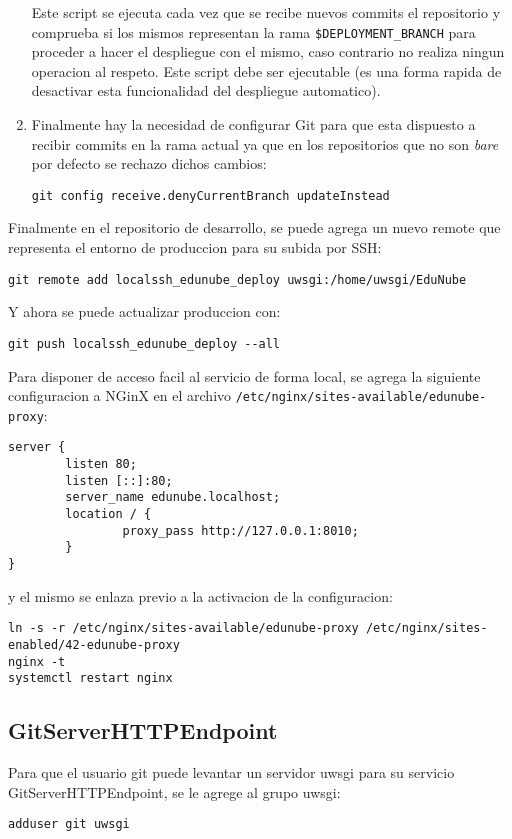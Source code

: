 \begin{enumerate}
\begin{lstlisting}[breaklines=true]
    \end{lstlisting}
    Este script se ejecuta cada vez que se recibe nuevos commits el repositorio y comprueba si los mismos representan la rama \texttt{\$DEPLOYMENT\_BRANCH} para proceder a hacer el despliegue con el mismo, caso contrario no realiza ningun operacion al respeto. Este script debe ser ejecutable (es una forma rapida de desactivar esta funcionalidad del despliegue automatico).
    \item Finalmente hay la necesidad de configurar Git para que esta dispuesto a recibir commits en la rama actual ya que en los repositorios que no son \textit{bare} por defecto se rechazo dichos cambios:
    \begin{lstlisting}
git config receive.denyCurrentBranch updateInstead
    \end{lstlisting}
\end{enumerate}

Finalmente en el repositorio de desarrollo, se puede agrega un nuevo remote que representa el entorno de produccion para su subida por SSH:
\begin{lstlisting}
git remote add localssh_edunube_deploy uwsgi:/home/uwsgi/EduNube
\end{lstlisting}

Y ahora se puede actualizar produccion con:
\begin{lstlisting}
git push localssh_edunube_deploy --all
\end{lstlisting}

Para disponer de acceso facil al servicio de forma local, se agrega la siguiente configuracion a NGinX en el archivo \texttt{/etc/nginx/sites-available/edunube-proxy}:
\begin{lstlisting}
server {
        listen 80;
        listen [::]:80;
        server_name edunube.localhost;
        location / {
                proxy_pass http://127.0.0.1:8010;
        }
}
\end{lstlisting}
y el mismo se enlaza previo a la activacion de la configuracion:
\begin{lstlisting}[breaklines=true]
ln -s -r /etc/nginx/sites-available/edunube-proxy /etc/nginx/sites-enabled/42-edunube-proxy
nginx -t
systemctl restart nginx
\end{lstlisting}

\subsection{GitServerHTTPEndpoint}
Para que el usuario git puede levantar un servidor uwsgi para su servicio GitServerHTTPEndpoint, se le agrege al grupo uwsgi:
\begin{lstlisting}
adduser git uwsgi
\end{lstlisting}


